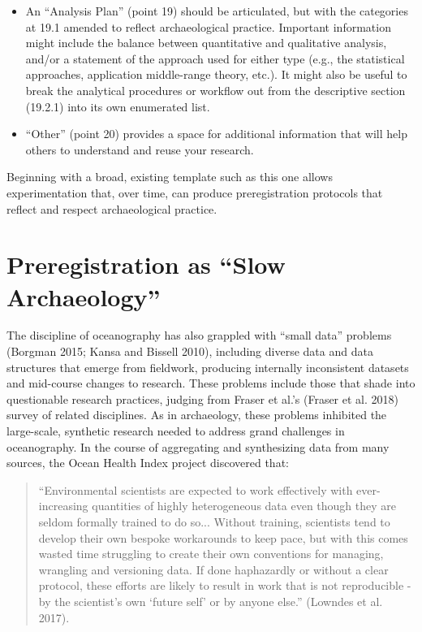 \documentclass[article]{sa}
\begin{document}
\begin{itemize}
\item  An ``Analysis Plan'' (point 19) should be articulated, but with the
  categories at 19.1 amended to reflect archaeological practice.
  Important information might include the balance between quantitative
  and qualitative analysis, and/or a statement of the approach used for
  either type (e.g., the statistical approaches, application
  middle-range theory, etc.). It might also be useful to break the
  analytical procedures or workflow out from the descriptive section
  (19.2.1) into its own enumerated list.
  
\item ``Other'' (point 20) provides a space for additional information that
  will help others to understand and reuse your research.
 
\end{itemize}

Beginning with a broad, existing template such as this one allows
experimentation that, over time, can produce preregistration protocols
that reflect and respect archaeological practice.

\section{Preregistration as ``Slow Archaeology''}

The discipline of oceanography has also grappled with ``small data''
problems (Borgman 2015; Kansa and Bissell 2010), including diverse data
and data structures that emerge from fieldwork, producing internally
inconsistent datasets and mid-course changes to research. These problems
include those that shade into questionable research practices, judging
from Fraser et al.'s (Fraser et al. 2018) survey of related disciplines.
As in archaeology, these problems inhibited the large-scale, synthetic
research needed to address grand challenges in oceanography. In the
course of aggregating and synthesizing data from many sources, the Ocean
Health Index project discovered that:

\begin{quote}

``Environmental scientists are expected to work effectively with
ever-increasing quantities of highly heterogeneous data even though they
are seldom formally trained to do so... Without training, scientists
tend to develop their own bespoke workarounds to keep pace, but with
this comes wasted time struggling to create their own conventions for
managing, wrangling and versioning data. If done haphazardly or without
a clear protocol, these efforts are likely to result in work that is not
reproducible - by the scientist's own `future self' or by anyone else.''
(Lowndes et al. 2017).

\end{quote}
\end{document}
